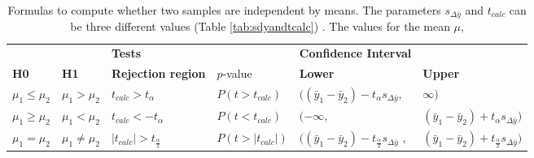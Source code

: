 \documentclass[10pt,a4paper]{report}
\begin{document}
	\begin{table}[h!]
		\centering
		\caption{Formulas to compute whether two samples are independent by means. 
			The parameters $s_{\Delta\bar{y}}$ and $t_{calc}$ can be three different 
			values (Table \ref{tab:sdyandtcalc}) \cite{heiberger2004statistical}. The values for the mean $\mu$, }
		\label{tab:IndepTest}
		\begin{tabular}{llllll}
			\hline
			&  & 
			\multicolumn{2}{l}{\textbf{Tests}} & 
			\textbf{Confidence Interval} & \textbf{}               \\ \cline{3-6} 
			\textbf{H0}              & \textbf{H1}              & \textbf{Rejection 
				region}   & $p$-value                      & 
			\textbf{Lower}               & \textbf{Upper}          \\ \hline
			$\mu_1 \leq \mu_2$                  & $\mu_1 > \mu_2$       & 
			$t_{calc} 
			> t_\alpha$       & $P(t > t_{calc})$      & 
			$((\bar{y}_1 
			- \bar{y}_2) - t_\alpha s_{\Delta \bar{y}}$,       & 
			$\infty)$                     \\
			$\mu_1 \geq \mu_2$                  & $\mu_1 < \mu_2$          & 
			$t_{calc} 
			< -t_\alpha$          & $P(t < t_{calc})$         & 
			$(-\infty$,                        & $(\bar{y}_1 - \bar{y}_2) + 
			t_\alpha 
			s_{\Delta \bar{y}})$ \\
			$\mu_1 = \mu_2$                  & $\mu_1 \neq \mu_2$                  
			& 
			$|t_{calc}| > t_{\frac{\alpha}{2}}$     & $P(t >
			|t_{calc}|)$  & $((\bar{y}_1 - \bar{y}_2) - 
			t_{\frac{\alpha}{2}} 
			s_{\Delta\bar{y}}$ 
			,     & $(\bar{y}_1 - \bar{y}_2) + t_{\frac{\alpha}{2}} 
			s_{\Delta 
				\bar{y}})$  
			\\ 
			\hline
		\end{tabular}
	\end{table}
	
\end{document}
